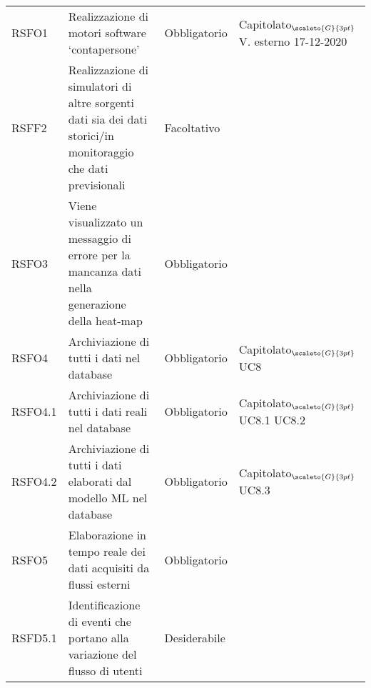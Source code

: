 \def\tabularxcolumn#1{m{#1}}
{

	\begin{center}
		\renewcommand{\arraystretch}{1.4}
		\begin{longtable}{|p{3cm}|p{4cm}|p{4cm}|p{4cm}|}
			\hline
			\rowcolor{airforceblue}
			\makecell[c]{\textbf{Codice RS}} & \makecell[c]{\textbf{Descrizione}} & \makecell[c]{\textbf{Tipo di requisito}} & \makecell[c]{\textbf{Fonte}} \\
			\hline
			\centering RSFO1 & Realizzazione di motori software ‘contapersone’  &\centering  Obbligatorio & \makecell[tc]{Capitolato$_{\scaleto{G}{3pt}}$ \\ V. esterno 17-12-2020 } \\
			\hline
			\centering RSFF2 & Realizzazione di simulatori di altre sorgenti dati sia dei dati storici/in monitoraggio che dati previsionali & \centering Facoltativo & \makecell[tc]{Capitolato$_{\scaleto{G}{3pt}}$ } \\
			\hline
			\centering RSFO3  & Viene visualizzato un messaggio di errore per la mancanza dati nella generazione della heat-map  &\centering  Obbligatorio & \makecell[tc]{UC2}  \\
			\hline
			\centering RSFO4 & Archiviazione di tutti i dati nel database & \centering Obbligatorio & \makecell[tc]{Capitolato$_{\scaleto{G}{3pt}}$ \\ UC8}  \\
			\hline
			\centering RSFO4.1 & Archiviazione di tutti i dati reali nel database & \centering Obbligatorio & \makecell[tc]{Capitolato$_{\scaleto{G}{3pt}}$ \\ UC8.1 \\ UC8.2}  \\
			\hline
			\centering RSFO4.2 & Archiviazione di tutti i dati elaborati dal modello ML nel database & \centering Obbligatorio & \makecell[tc]{Capitolato$_{\scaleto{G}{3pt}}$ \\ UC8.3}  \\
			\hline
			\centering RSFO5 & Elaborazione in tempo reale dei dati acquisiti da flussi esterni &\centering  Obbligatorio & \makecell[tc]{Capitolato$_{\scaleto{G}{3pt}}$}  \\
			\hline
			\centering RSFD5.1 & Identificazione di eventi che portano alla variazione del flusso di utenti &\centering  Desiderabile & \makecell[tc]{Capitolato$_{\scaleto{G}{3pt}}$}  \\

\end{longtable}
\end{center}}

